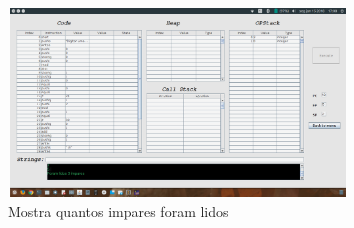 \documentclass{report}
\begin{document}
\begin{figure}[h]
	\centering
	\includegraphics[width=9cm,height= 5cm]{exemplo4-1.png}
	\caption{Mostra quantos impares foram lidos}
	\label{Exemplo 4.1}
\end{figure}
\end{document}
